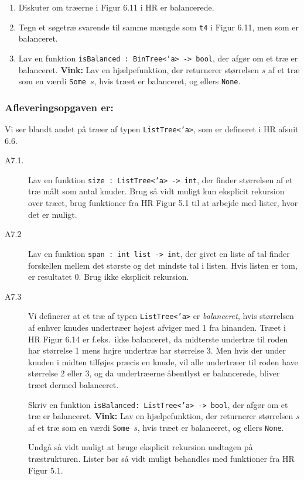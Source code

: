 \documentclass[a4paper]{article}
\begin{document}
\begin{description}
  \begin{enumerate}[i]
    \item Diskuter om træerne i Figur 6.11 i HR er balancerede.
    \item Tegn et søgetræ svarende til samme mængde som \texttt{t4} i
      Figur 6.11, men som er balanceret.

    \item Lav en funktion \texttt{isBalanced : BinTree<'a> -> bool},
      der afgør om et træ er balanceret.  \textbf{Vink:} Lav en
      hjælpefunktion, der returnerer størrelsen $s$ af et træ som en
      værdi \texttt{Some $s$}, hvis træet er balanceret, og ellers
      \texttt{None}.
  \end{enumerate}

\end{description}

\newpage
\subsubsection*{Afleveringsopgaven er:}

Vi ser blandt andet på træer af typen \texttt{ListTree<'a>}, som er
defineret i HR afsnit 6.6.

\begin{description}

\item[A7.1.] Lav en funktion \texttt{size : ListTree<'a> -> int}, der
  finder størrelsen af et træ målt som antal knuder.  Brug så vidt
  muligt kun eksplicit rekursion over træet, brug funktioner fra HR
  Figur 5.1 til at arbejde med lister, hvor det er muligt.

\item[A7.2] Lav en funktion \texttt{span : int list -> int}, der givet
  en liste af tal finder forskellen mellem det største og det mindste
  tal i listen.  Hvis listen er tom, er resultatet 0.  Brug ikke
  eksplicit rekursion.

\item[A7.3] Vi definerer at et træ af typen \texttt{ListTree<'a>} er
  \emph{balanceret}, hvis størrelsen af enhver knudes undertræer
  højest afviger med 1 fra hinanden.  Træet i HR Figur 6.14 er
  f.eks.\ ikke balanceret, da midterste undertræ til roden har
  størrelse 1 mens højre undertræ har størrelse 3.  Men hvis der under
  knuden i midten tilføjes præcis en knude, vil alle undertræer til
  roden have størrelse 2 eller 3, og da undertræerne åbentlyst er
  balancerede, bliver træet dermed balanceret.

  Skriv en funktion \texttt{isBalanced: ListTree<'a> -> bool}, der
  afgør om et træ er balanceret.  \textbf{Vink:} Lav en
  hjælpefunktion, der returnerer størrelsen $s$ af et træ som en værdi
  \texttt{Some $s$}, hvis træet er balanceret, og ellers
  \texttt{None}.

  Undgå så vidt muligt at bruge eksplicit rekursion undtagen på
  træstrukturen.  Lister bør så vidt muligt behandles med funktioner
  fra HR Figur 5.1.
\end{description}
\end{document}
